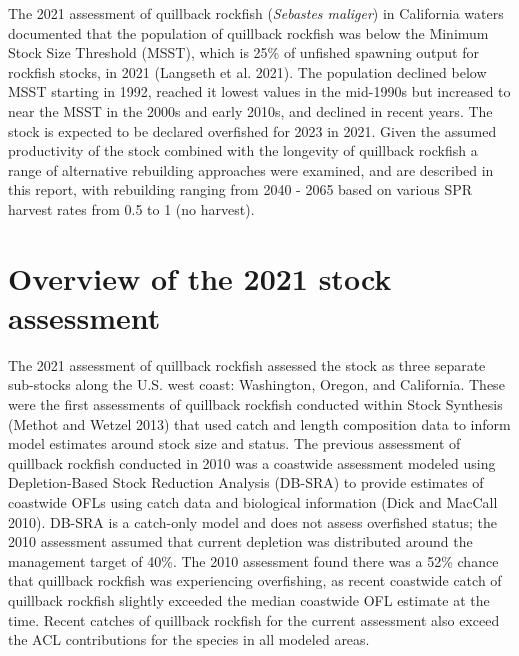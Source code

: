 \documentclass[11pt,
  english,
  a4paper,
]{article}
\begin{document}
The 2021 assessment of quillback rockfish (\emph{Sebastes maliger}) in California waters documented that the population of quillback rockfish was below the Minimum Stock Size Threshold (MSST), which is 25\% of unfished spawning output for rockfish stocks, in 2021 {(Langseth et al. 2021)\leavevmode\tagmcend\tagstructend}. The population declined below MSST starting in 1992, reached it lowest values in the mid-1990s but increased to near the MSST in the 2000s and early 2010s, and declined in recent years. The stock is expected to be declared overfished for 2023 in 2021. Given the assumed productivity of the stock combined with the longevity of quillback rockfish a range of alternative rebuilding approaches were examined, and are described in this report, with rebuilding ranging from 2040 - 2065 based on various SPR harvest rates from 0.5 to 1 (no harvest).

\leavevmode\tagmcend\tagstructend\par


\hypertarget{overview-of-the-2021-stock-assessment}{%
\section{Overview of the 2021 stock assessment}\label{overview-of-the-2021-stock-assessment}}

\leavevmode\tagmcend\tagstructend


The 2021 assessment of quillback rockfish assessed the stock as three separate sub-stocks along the U.S. west coast: Washington, Oregon, and California. These were the first assessments of quillback rockfish conducted within Stock Synthesis {(Methot and Wetzel 2013)\leavevmode\tagmcend\tagstructend} that used catch and length composition data to inform model estimates around stock size and status. The previous assessment of quillback rockfish conducted in 2010 was a coastwide assessment modeled using Depletion-Based Stock Reduction Analysis (DB-SRA) to provide estimates of coastwide OFLs using catch data and biological information {(Dick and MacCall 2010)\leavevmode\tagmcend\tagstructend}. DB-SRA is a catch-only model and does not assess overfished status; the 2010 assessment assumed that current depletion was distributed around the management target of 40\%. The 2010 assessment found there was a 52\% chance that quillback rockfish was experiencing overfishing, as recent coastwide catch of quillback rockfish slightly exceeded the median coastwide OFL estimate at the time. Recent catches of quillback rockfish for the current assessment also exceed the ACL contributions for the species in all modeled areas.
\end{document}
